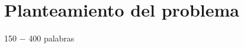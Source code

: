 \section{Planteamiento del problema}
\label{Planteamiento del problema}
150 − 400 palabras\\
\lipsum